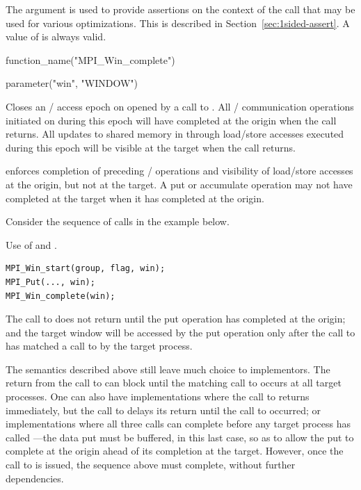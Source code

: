 The  argument is used to provide assertions on the
context of the call that may be used for various optimizations.  This
is described in
Section~\ref{sec:1sided-assert}.  A value of  is
always valid.

%
\begin{mpi-binding}
    function_name("MPI_Win_complete")
    
    parameter("win", "WINDOW")
\end{mpi-binding}

Closes an \RMA/ access epoch on  opened by a
call to .  All \RMA/ communication
operations initiated on  during this epoch will have completed at
the origin when the call returns.
All updates to shared memory in  through load/store accesses executed during this epoch will be visible
at the target when the call returns.

 enforces completion of preceding \RMA/
operations and visibility of load/store accesses at the origin, but not at the target.
A put or accumulate operation may not have completed
at the target when it has completed at the origin.

Consider the sequence of calls in the example below.
\begin{example}
\label{ex:1sided-start-complete}
%
Use of  and .
\begin{lstlisting}[language={[MPI]C}]
MPI_Win_start(group, flag, win);
MPI_Put(..., win);
MPI_Win_complete(win);
\end{lstlisting}

The call to  does not return until the
put operation has completed at the origin; and
the target window will be accessed by the put operation only after the
call to  has matched a call to
 by the target process.
\end{example}

\begin{implementors}
The semantics described above still leave
much choice to implementors. The return from the call to
 can block until the matching call to
 occurs at all target processes.  One can also
have implementations where the call to  returns immediately, but the
call to  delays its return until the call to
 occurred; or implementations where all
three calls can complete before any target process
has called 
---the
data put must be buffered, in this last case, so as to allow the
put to complete at the origin ahead of its completion at the 
target.
However, once the
call to  is issued, the sequence above
must complete, without further dependencies.
\end{implementors}

